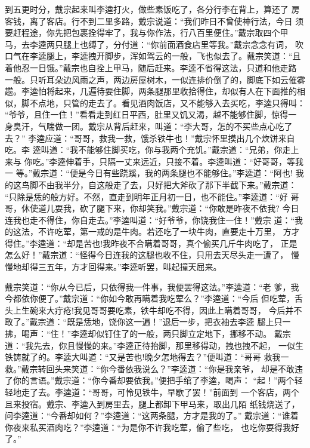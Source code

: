 到五更时分，戴宗起来叫李逵打火，做些素饭吃了，各分行李在背上，算还了
房客钱，离了客店。行不到二里多路，戴宗说道：“我们昨日不曾使神行法，今日
须要赶程途，你先把包裹拴得牢了，我与你作法，行八百里便住。”戴宗取四个甲
马，去李逵两只腿上也缚了，分付道：“你前面酒食店里等我。”戴宗念念有词，
吹口气在李逵腿上，李逵拽开脚步，浑如驾云的一般，飞也似去了。戴宗笑道：“且
着他忍一日饿。”戴宗也自拴上甲马，随后赶来。李逵不省得这法，只道和他走路
一般。只听耳朵边风雨之声，两边房屋树木，一似连排价倒了的，脚底下如云催雾
趱。李逵怕将起来，几遍待要住脚，两条腿那里收拾得住，却似有人在下面推的相
似，脚不点地，只管的走去了。看见酒肉饭店，又不能够入去买吃，李逵只得叫：
“爷爷，且住一住！”看看走到红日平西，肚里又饥又渴，越不能够住脚，惊得一
身臭汗，气喘做一团。戴宗从背后赶来，叫道：“李大哥，怎的不买些点心吃了去？”
李逵应道：“哥哥，救我一救，饿杀铁牛也！”戴宗怀里摸出几个炊饼来自吃。李
逵叫道：“我不能够住脚买吃，你与我两个充饥。”戴宗道：“兄弟，你走上来与
你吃。”李逵伸着手，只隔一丈来远近，只接不着。李逵叫道：“好哥哥，等我一
等。”戴宗道：“便是今日有些跷蹊，我的两条腿也不能够住。”李逵道：“阿也!
我的这鸟脚不由我半分，自这般走了去，只好把大斧砍了那下半截下来。”戴宗道：
“只除是恁的般方好。不然，直走到明年正月初一日，也不能住。”李逵道：“好
哥哥，休使道儿耍我，砍了腿下来，你却笑我。”戴宗道：“你敢是昨夜不依我?
今日连我也走不得住，你自走去。”李逵叫道：“好爷爷，你饶我住一住！”戴宗
道：“我的这法，不许吃荤，第一戒的是牛肉。若还吃了一块牛肉，直要走十万里，
方才得住。”李逵道：“却是苦也!我昨夜不合瞒着哥哥，真个偷买几斤牛肉吃了，
正是怎么好！”戴宗道：“怪得今日连我的这腿也收不住，只用去天尽头走一遭了，
慢慢地却得三五年，方才回得来。”李逵听罢，叫起撞天屈来。

戴宗笑道：“你从今已后，只依得我一件事，我便罢得这法。”李逵道：“老
爹，我今都依你便了。”戴宗道：“你如今敢再瞒着我吃荤么？”李逵道：“今后
但吃荤，舌头上生碗来大疔疮!我见哥哥要吃素，铁牛却吃不得，因此上瞒着哥哥，
今后并不敢了。”戴宗道：“既是恁地，饶你这一遍！”退后一步，把衣袖去李逵
腿上只一拂，喝声：“住！”李逵却似钉住了的一般，两只脚立定地下，挪移不动。
戴宗道：“我先去，你且慢慢的来。”李逵正待抬脚，那里移得动，拽也拽不起，
一似生铁铸就了的。李逵大叫道：“又是苦也!晚夕怎地得去？”便叫道：“哥哥
救我一救。”戴宗转回头来笑道：“你今番依我说么？”李逵道：“你是我亲爷，
却是不敢违了你的言语。”戴宗道：“你今番却要依我。”便把手绾了李逵，喝声：
“起！”两个轻轻地走了去。李逵道：“哥哥，可怜见铁牛，早歇了罢！”前面到
一个客店，两个且来投宿。戴宗、李逵入到房里去，腿上都卸下甲马来，取出几陌
纸钱烧送了，问李逵道：“今番却如何？”李逵道：“这两条腿，方才是我的了。”
戴宗道：“谁着你夜来私买酒肉吃？”李逵道：“为是你不许我吃荤，偷了些吃，
也吃你耍得我好了。”

